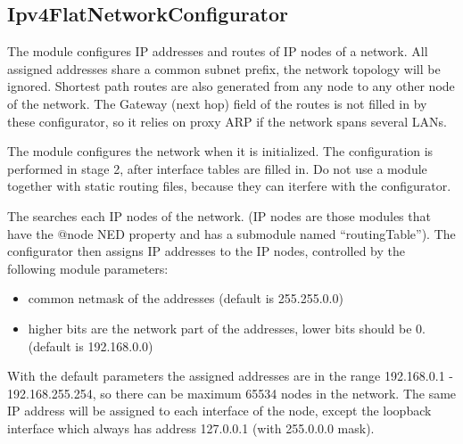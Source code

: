 \subsection{Ipv4FlatNetworkConfigurator}

The  module configures
IP addresses and routes of IP nodes of a network.
All assigned addresses share a common subnet prefix,
the network topology will be ignored. Shortest path
routes are also generated from any node to any other
node of the network. The Gateway (next hop) field of the routes
is not filled in by these configurator, so it relies
on proxy ARP if the network spans several LANs.


The  module configures
the network when it is initialized. The configuration
is performed in stage 2, after interface tables are
filled in. Do not use a 
module together with static routing files, because they
can iterfere with the configurator.

The  searches each IP nodes of the network.
(IP nodes are those modules that have the @node NED property and
has a  submodule named ``routingTable'').
The configurator then assigns IP addresses to the IP nodes, controlled
by the following module parameters:
\begin{itemize}
  \item {} common netmask of the addresses (default is 255.255.0.0)
  \item {} higher bits are the network part of the addresses,
        lower bits should be 0. (default is 192.168.0.0)
\end{itemize}

With the default parameters the assigned addresses are in the range
192.168.0.1 - 192.168.255.254, so there can be maximum 65534 nodes in the
network. The same IP address will be assigned to each interface
of the node, except the loopback interface which always has address 127.0.0.1
(with 255.0.0.0 mask).

